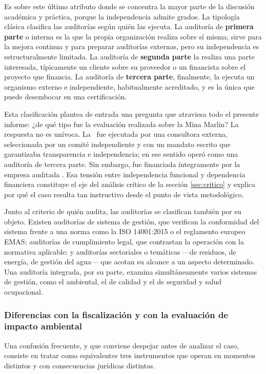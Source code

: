 Es sobre este último atributo donde se concentra la mayor parte de la discusión
académica y práctica, porque la independencia admite grados. La tipología clásica
clasifica las auditorías según quién las ejecuta. La auditoría de
\textbf{primera parte} o interna es la que la propia organización realiza sobre sí
misma; sirve para la mejora continua y para preparar auditorías externas, pero su
independencia es estructuralmente limitada. La auditoría de \textbf{segunda parte}
la realiza una parte interesada, típicamente un cliente sobre su proveedor o un
financista sobre el proyecto que financia. La auditoría de \textbf{tercera parte},
finalmente, la ejecuta un organismo externo e independiente, habitualmente
acreditado, y es la única que puede desembocar en una certificación.

Esta clasificación plantea de entrada una pregunta que atraviesa todo el presente
informe: ¿de qué tipo fue la evaluación realizada sobre la Mina Marlin? La
respuesta no es unívoca. La \hria\ fue ejecutada por una consultora externa,
seleccionada por un comité independiente y con un mandato escrito que garantizaba
transparencia e independencia; en ese sentido operó como una auditoría de tercera
parte. Sin embargo, fue financiada íntegramente por la empresa auditada
\parencite{oncommonground2010hria}. Esa tensión entre independencia funcional y
dependencia financiera constituye el eje del análisis crítico de la sección
\ref{sec:critico} y explica por qué el caso resulta tan instructivo desde el punto
de vista metodológico.

Junto al criterio de quién audita, las auditorías se clasifican también por su
objeto. Existen auditorías de sistema de gestión, que verifican la conformidad del
sistema frente a una norma como la ISO 14001:2015 o el reglamento europeo EMAS;
auditorías de cumplimiento legal, que contrastan la operación con la normativa
aplicable; y auditorías sectoriales o temáticas —de residuos, de energía, de
gestión del agua— que acotan su alcance a un aspecto determinado. Una auditoría
integrada, por su parte, examina simultáneamente varios sistemas de gestión, como
el ambiental, el de calidad y el de seguridad y salud ocupacional.

\subsubsection{Diferencias con la fiscalización y con la evaluación de impacto ambiental}

Una confusión frecuente, y que conviene despejar antes de analizar el caso,
consiste en tratar como equivalentes tres instrumentos que operan en momentos
distintos y con consecuencias jurídicas distintas.

